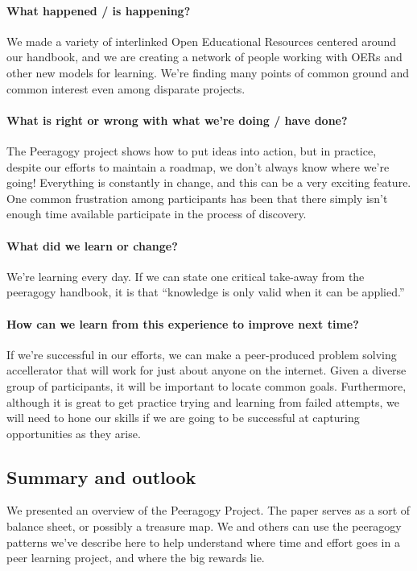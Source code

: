 \documentclass{acm_proc_article-sp}
\begin{document}
\paragraph{What happened / is happening?}
We made a variety of interlinked Open Educational Resources centered
around our handbook, and we are creating a network of people working
with OERs and other new models for learning.  We're finding many
points of common ground and common interest even among disparate
projects.
\paragraph{What is right or wrong with what we're doing / have done?}
The Peeragogy project shows how to put ideas into action, but in
practice, despite our efforts to maintain a roadmap, we don't always
know where we're going!  Everything is constantly in change, and this
can be a very exciting feature.  One common frustration among
participants has been that there simply isn't enough time available
participate in the process of discovery.
\paragraph{What did we learn or change?}
We're learning every day.  If we can state one critical take-away from
the peeragogy handbook, it is that ``knowledge is only valid when it
can be applied.''
\paragraph{How can we learn from this experience to improve next time?}
If we're successful in our efforts, we can make a peer-produced
problem solving accellerator that will work for just about anyone on
the internet.  Given a diverse group of participants, it will be
important to locate common goals.  Furthermore, although it is great
to get practice trying and learning from failed attempts, we will need
to hone our skills if we are going to be successful at capturing
opportunities as they arise.

\subsection{Summary and outlook}

We presented an overview of the Peeragogy Project.  The paper serves
as a sort of balance sheet, or possibly a treasure map.  We and others
can use the peeragogy patterns we've describe here to help understand
where time and effort goes in a peer learning project, and where the
big rewards lie.
\end{document}
